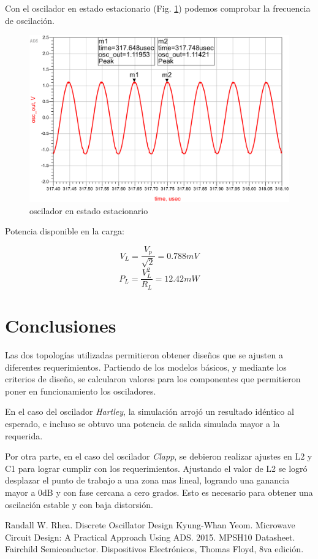 \documentclass[journal]{IEEEtran}
\begin{document}
Con el oscilador en estado estacionario (Fig. \ref{fig:hartley_osc_est}) podemos comprobar la frecuencia de oscilación.

\begin{figure}[H]
\centering
\includegraphics[width=1\linewidth]{capturas/hartley_osc_est-cropped.pdf}
\caption{oscilador en estado estacionario}
\label{fig:hartley_osc_est}
\end{figure}

Potencia disponible en la carga:

$$V_L=\frac{V_p}{\sqrt{ 2 }}=0.788mV$$
$$P_L=\frac{V_L^2}{R_L}=12.42mW$$

\section{Conclusiones}
Las dos topologías utilizadas permitieron obtener diseños que se ajusten a diferentes requerimientos.
Partiendo de los modelos básicos, y mediante los criterios de diseño, se calcularon valores para los componentes que permitieron poner en funcionamiento los osciladores. 

En el caso del oscilador \emph{Hartley}, la simulación arrojó un resultado idéntico al esperado, e incluso se obtuvo una potencia de salida simulada mayor a la requerida.

Por otra parte, en el caso del oscilador \emph{Clapp}, se debieron realizar ajustes en L2 y C1 para lograr cumplir con los requerimientos. Ajustando el valor de L2 se logró desplazar el punto de trabajo a una zona mas lineal, logrando una ganancia mayor a 0dB y con fase cercana a cero grados. Esto es necesario para obtener una oscilación estable y con baja distorsión.



\begin{thebibliography}{00}
 Randall W. Rhea. Discrete Oscillator Design
 Kyung-Whan Yeom. Microwave Circuit Design: A Practical Approach Using ADS. 2015. 
 MPSH10 Datasheet. Fairchild Semiconductor. 
 Dispositivos Electrónicos, Thomas Floyd, 8va edición.
\end{thebibliography}
\end{document}
